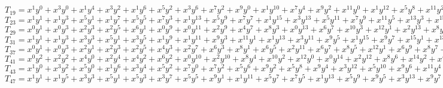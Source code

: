 $T_{19} = x^{1}y^{0} + x^{3}y^{0} + x^{1}y^{4} + x^{3}y^{2} + x^{1}y^{6} + x^{5}y^{2} + x^{3}y^{6} + x^{7}y^{2} + x^{9}y^{0} + x^{1}y^{10} + x^{7}y^{4} + x^{9}y^{2} + x^{11}y^{0} + x^{1}y^{12} + x^{5}y^{8} + x^{11}y^{2} + x^{13}y^{0} + x^{3}y^{12} + x^{7}y^{8} + x^{9}y^{6} + x^{11}y^{4} + x^{13}y^{2} + x^{3}y^{14} + x^{7}y^{10} + x^{11}y^{6} + x^{15}y^{2} + x^{17}y^{0} + \dots $\\
$T_{23} = x^{1}y^{1} + x^{1}y^{3} + x^{5}y^{1} + x^{1}y^{7} + x^{5}y^{5} + x^{7}y^{3} + x^{1}y^{13} + x^{5}y^{9} + x^{7}y^{7} + x^{1}y^{15} + x^{3}y^{13} + x^{5}y^{11} + x^{7}y^{9} + x^{11}y^{5} + x^{13}y^{3} + x^{15}y^{1} + x^{17}y^{1} + \dots $\\
$T_{29} = x^{0}y^{1} + x^{0}y^{3} + x^{2}y^{3} + x^{2}y^{5} + x^{6}y^{1} + x^{0}y^{9} + x^{0}y^{11} + x^{2}y^{9} + x^{4}y^{7} + x^{8}y^{3} + x^{0}y^{13} + x^{6}y^{7} + x^{10}y^{3} + x^{12}y^{1} + x^{2}y^{13} + x^{8}y^{7} + x^{4}y^{13} + x^{6}y^{11} + x^{12}y^{5} + x^{14}y^{3} + x^{16}y^{1} + \dots $\\
$T_{31} = x^{1}y^{1} + x^{1}y^{3} + x^{3}y^{3} + x^{5}y^{1} + x^{3}y^{5} + x^{1}y^{9} + x^{1}y^{11} + x^{9}y^{3} + x^{11}y^{1} + x^{1}y^{13} + x^{3}y^{11} + x^{9}y^{5} + x^{1}y^{15} + x^{9}y^{7} + x^{15}y^{1} + x^{13}y^{5} + x^{15}y^{3} + \dots $\\
$T_{37} = x^{0}y^{1} + x^{0}y^{3} + x^{2}y^{1} + x^{2}y^{3} + x^{2}y^{5} + x^{4}y^{3} + x^{2}y^{7} + x^{6}y^{3} + x^{8}y^{1} + x^{6}y^{5} + x^{2}y^{11} + x^{6}y^{7} + x^{8}y^{5} + x^{12}y^{1} + x^{6}y^{9} + x^{8}y^{7} + x^{2}y^{15} + x^{4}y^{13} + x^{12}y^{5} + \dots $\\
$T_{41} = x^{0}y^{2} + x^{2}y^{2} + x^{4}y^{0} + x^{2}y^{4} + x^{4}y^{2} + x^{6}y^{2} + x^{0}y^{10} + x^{2}y^{10} + x^{8}y^{4} + x^{10}y^{2} + x^{12}y^{0} + x^{0}y^{14} + x^{2}y^{12} + x^{8}y^{6} + x^{14}y^{2} + x^{4}y^{14} + x^{8}y^{10} + x^{10}y^{8} + x^{16}y^{2} + \dots $\\
$T_{43} = x^{1}y^{0} + x^{3}y^{2} + x^{5}y^{0} + x^{1}y^{6} + x^{3}y^{4} + x^{5}y^{2} + x^{7}y^{0} + x^{7}y^{2} + x^{5}y^{6} + x^{9}y^{2} + x^{5}y^{8} + x^{9}y^{4} + x^{3}y^{12} + x^{5}y^{10} + x^{9}y^{6} + x^{11}y^{4} + x^{3}y^{14} + x^{5}y^{12} + x^{9}y^{8} + x^{11}y^{6} + x^{13}y^{4} + \dots $\\ 
$T_{47} = x^{1}y^{1} + x^{1}y^{5} + x^{3}y^{3} + x^{5}y^{1} + x^{5}y^{3} + x^{3}y^{7} + x^{5}y^{5} + x^{9}y^{1} + x^{1}y^{11} + x^{5}y^{7} + x^{7}y^{5} + x^{1}y^{13} + x^{5}y^{9} + x^{9}y^{5} + x^{3}y^{13} + x^{9}y^{7} + x^{11}y^{5} + x^{13}y^{3} + x^{15}y^{1} + x^{3}y^{15} + x^{7}y^{11} + x^{9}y^{9} + x^{15}y^{3} + \dots $\\
